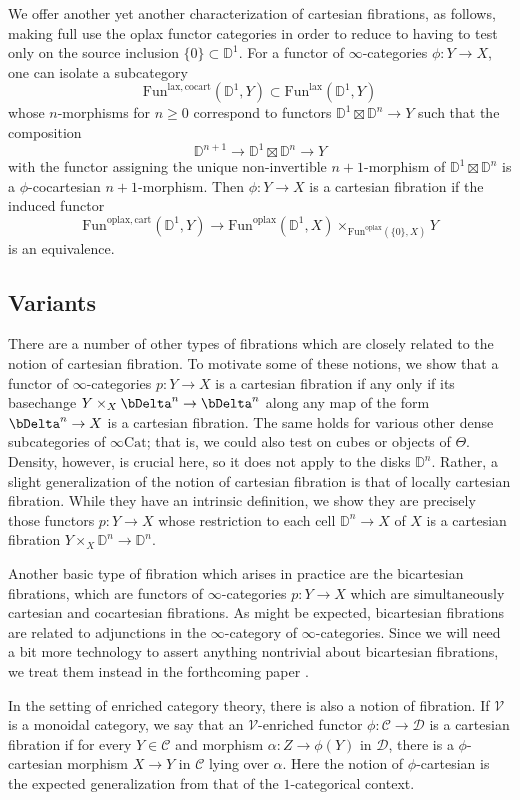 \documentclass[10pt,oneside]{article}
\numberwithin{equation}{section} %
\numberwithin{figure}{section} %
\theoremstyle{plain}
\theoremstyle{definition}
\newcommand{\bD}{{\mathbb D}}
\newcommand{\mC}{{\mathcal C}}
\newcommand{\mD}{{\mathcal D}}
\newcommand{\mV}{{\mathcal V}}
\newcommand{\Cat}{\mathrm{Cat}}
\newcommand{\Fun}{\mathrm{Fun}}
\newcommand{\cocart}{{\mathrm{cocart}}}
\newcommand{\cart}{{\mathrm{cart}}}
\newcommand{\lax}{{\mathrm{lax}}}
\newcommand{\oplax}{{\mathrm{oplax}}}
\begin{document}
We offer another yet another characterization of cartesian fibrations, as follows, making full use the oplax functor categories in order to reduce to having to test only on the source inclusion $\{0\}\subset\bD^1$.
For a functor of $\infty$-categories $\phi: Y\to X$, one can isolate
a subcategory $$ \Fun^{\lax, \cocart}(\bD^1,Y) \subset \Fun^{\lax}(\bD^1,Y)$$ whose $n$-morphisms for $n \geq 0$
correspond to functors $\bD^1 \boxtimes \bD^n \to Y$
such that the composition $$ \bD^{n+1} \to \bD^1 \boxtimes \bD^n \to Y $$
with the functor assigning the unique non-invertible $n+1$-morphism of $\bD^1 \boxtimes \bD^n$
is a $\phi$-cocartesian $n+1$-morphism.
Then $\phi:Y\to X$ is a cartesian fibration if the induced functor
$$
\Fun^{\oplax, \cart}(\bD^1,Y) \to \Fun^\oplax(\bD^1,X) \times_{\Fun^\oplax(\{0\},X)} Y
$$
is an equivalence.


\subsection{Variants}
There are a number of other types of fibrations which are closely related to the notion of cartesian fibration.
To motivate some of these notions, we show that a functor of $\infty$-categories $p:Y\to X$ is a cartesian fibration if any only if its basechange $Y\times_{X}\bDelta^n\to\bDelta^n$ along any map of the form $\bDelta^n\to X$ is a cartesian fibration.
The same holds for various other dense subcategories of $\infty\Cat$; that is, we could also test on cubes or objects of $\Theta$.
Density, however, is crucial here, so it does not apply to the disks $\bD^n$.
Rather, a slight generalization of the notion of cartesian fibration is that of locally cartesian fibration.
While they have an intrinsic definition, we show they are precisely those functors $p:Y\to X$ whose restriction to each cell $\bD^n\to X$ of $X$ is a cartesian fibration $Y\times_X\bD^n\to\bD^n$.


Another basic type of fibration which arises in practice are the bicartesian fibrations, which are functors of $\infty$-categories $p:Y\to X$ which are simultaneously cartesian and cocartesian fibrations.
As might be expected, bicartesian fibrations are related to adjunctions in the $\infty$-category of $\infty$-categories.
Since we will need a bit more technology to assert anything nontrivial about bicartesian fibrations, we treat them instead in the forthcoming paper \cite{OrientedGrothendieck2026}.

In the setting of enriched category theory, there is also a notion of fibration.
If $\mV$ is a monoidal category, we say that an $\mV$-enriched functor $\phi: \mC \to \mD$ is a cartesian fibration if for every $Y \in \mC$ and morphism $\alpha: Z \to \phi(Y)$ in $\mD$, there is a $\phi$-cartesian morphism $X \to Y$ in $\mC$ lying over $\alpha$.
Here the notion of $\phi$-cartesian is the expected generalization from that of the $1$-categorical context.
\end{document}
